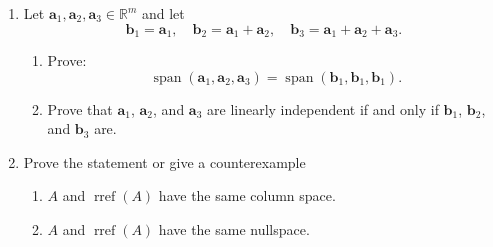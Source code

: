 \documentclass[12pt]{amsart}
\newcommand{\RR}{\mathbb{R}}
\DeclareMathOperator{\rref}{rref}
\DeclareMathOperator{\Span}{span}
\theoremstyle{definition} \newtheorem{definition}[theorem]{Definition}
\newcommand{\ba}{\mathbf{a}}
\newcommand{\bb}{\mathbf{b}}
\newcommand{\spn}[1]{\Span\left(#1\right)}
\begin{document}
\begin{enumerate}
  \item Let $\ba_1,\ba_2,\ba_3\in\RR^m$ and let 
    \[
    \bb_1=\ba_1,\quad \bb_2=\ba_1+\ba_2,\quad \bb_3=\ba_1+\ba_2+\ba_3.
    \]
    \begin{enumerate}
  \item Prove:
    \[
      \spn{\ba_1,\ba_2,\ba_3} = \spn{\bb_1,\bb_1,\bb_1}.
    \]
  \item Prove that $\ba_1$, $\ba_2$, and $\ba_3$ are linearly independent if and only if $\bb_1$, $\bb_2$, and $\bb_3$ are.
  \end{enumerate}


  \item Prove the statement or give a counterexample
    \bigskip
    \begin{enumerate}
      \setlength{\itemsep}{0.5em}
    \item $A$ and $\rref(A)$ have the same column space.

    \item $A$ and $\rref(A)$ have the same nullspace.
    \end{enumerate}
\end{enumerate}
\end{document}
